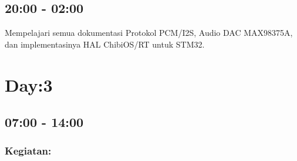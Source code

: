 \documentclass[12pt,]{article}
\begin{document}
	\subsection{20:00 - 02:00}
	Mempelajari semua dokumentasi Protokol PCM/I2S, Audio DAC MAX98375A, dan implementasinya HAL ChibiOS/RT untuk STM32. 
	
	\newpage
	\section{Day:3}
	\subsection{07:00 - 14:00}
	\subsubsection{Kegiatan:}
\end{document}
